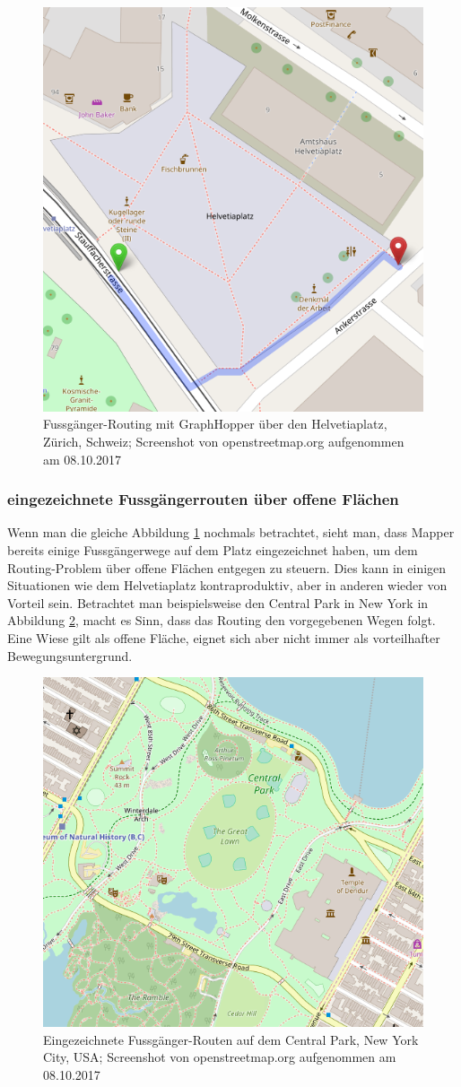 \begin{figure}[ht]
	\centering
	\includegraphics[width=0.5\linewidth]{technicalreport/img/helvetiaplatz_graphhopper}
	\caption[Fussgänger-Routing]{Fussgänger-Routing mit GraphHopper \cite{graphhopper} über den Helvetiaplatz, Zürich, Schweiz; Screenshot von openstreetmap.org aufgenommen am 08.10.2017}
	\label{fig:helvetiaplatz_graphhopper}
\end{figure}

\subsubsection{eingezeichnete Fussgängerrouten über offene Flächen}
\label{problem:eingezeichnete Fussgängerrouten über offene Flächen}
Wenn man die gleiche Abbildung \ref{fig:helvetiaplatz_graphhopper} nochmals betrachtet, sieht man, dass Mapper bereits einige Fussgängerwege auf dem Platz eingezeichnet haben, um dem Routing-Problem über offene Flächen entgegen zu steuern. Dies kann in einigen Situationen wie dem Helvetiaplatz kontraproduktiv, aber in anderen wieder von Vorteil sein. Betrachtet man beispielsweise den Central Park in New York in Abbildung \ref{fig:central_park}, macht es Sinn, dass das Routing den vorgegebenen Wegen folgt. Eine Wiese gilt als offene Fläche, eignet sich aber nicht immer als vorteilhafter Bewegungsuntergrund. 

\begin{figure}[ht]
\centering
\includegraphics[width=0.5\linewidth]{technicalreport/img/central_park}
\caption[eingezeichnete Fussgänger-Routen]{Eingezeichnete Fussgänger-Routen auf dem Central Park, New York City, USA; Screenshot von openstreetmap.org aufgenommen am 08.10.2017}
\label{fig:central_park}
\end{figure}

